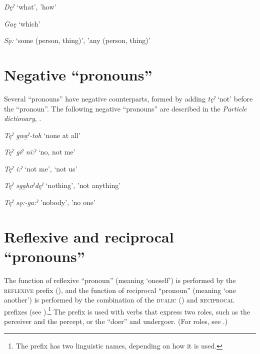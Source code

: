 \begin{CayugaRelated}
\item{} \textit{Dęˀ} ‘what’, 'how’\\
\item{} \textit{Gaę} ‘which’\\
\item{} \textit{Sǫ:} ‘some (person, thing)’, 'any (person, thing)’\\
\end{CayugaRelated}


\section{Negative “pronouns”} \label{ch:’Negative pronouns’}
Several “pronouns” have negative counterparts, formed by adding \textit{tęˀ} ‘not’ before the “pronoun”. The following negative “pronouns” are described in the \textit{Particle dictionary}, .

\begin{CayugaRelated}
\item{} \textit{Tęˀ gwa̱ˀ-toh} ‘none at all’\\
\item{} \textit{Tęˀ giˀ ni:ˀ} ‘no, not me’\\
\item{} \textit{Tęˀ i:ˀ} ‘not me’, ‘not us’\\
\item{} \textit{Tęˀ sga̱hoˀdęˀ} ‘nothing’, 'not anything’\\
\item{} \textit{Tęˀ sǫ:-ga:ˀ} 'nobody’, 'no one’\\
\end{CayugaRelated}


\section{Reflexive and reciprocal “pronouns”} \label{ch:’Reflexive’ and ‘reciprocal pronouns’}
The function of reflexive “pronoun” (meaning ‘oneself’) is performed by the \linebreak {} \textsc{reflexive} prefix (), and the function of reciprocal “pronoun” (meaning ‘one another’) is performed by the combination of the  \textsc{dualic} () and  \textsc{reciprocal} prefixes (see ).\footnote{The  prefix  has two linguistic names, depending on how it is used.} The  prefix is used with verbs that express two roles, such as the perceiver and the percept, or the “doer” and undergoer. (For roles, see .)

